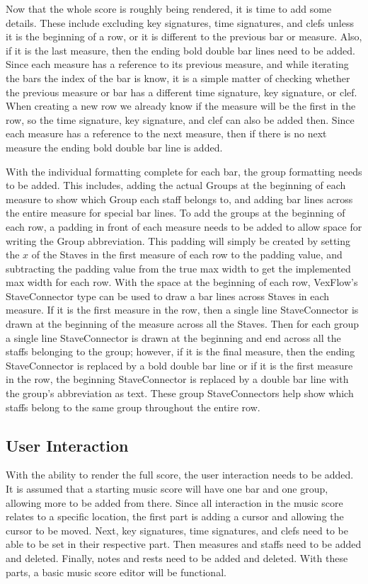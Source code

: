 \documentclass[letterpaper,12pt]{article}
\begin{document}
Now that the whole score is roughly being rendered, it is time to add some details. These include excluding key
signatures, time signatures, and clefs unless it is the beginning of a row, or it is different to the previous bar or
measure. Also, if it is the last measure, then the ending bold double bar lines need to be added. Since each measure has a
reference to its previous measure, and while iterating the bars the index of the bar is know, it is a simple
matter of checking whether the previous measure or bar has a different time signature, key signature, or clef. When
creating a new row we already know if the measure will be the first in the row, so the time signature, key signature,
and clef can also be added then. Since each measure has a reference to the next measure, then if there is no next
measure the ending bold double bar line is added.

With the individual formatting complete for each bar, the group formatting needs to be added. This includes, adding
the actual Groups at the beginning of each measure to show which Group each staff belongs to, and adding bar lines
across the entire measure for special bar lines. To add the groups at the beginning of each row, a padding in front of
each measure needs to be added to allow space for writing the Group abbreviation. This padding will simply be created by
setting the $ x $ of the Staves in the first measure of each row to the padding value, and subtracting the padding
value from the true max width to get the implemented max width for each row. With the space at the beginning of each
row, VexFlow's StaveConnector type can be used to draw a bar lines across Staves in each measure. If it is the first
measure in the row, then a single line StaveConnector is drawn at the beginning of the measure across all the Staves.
Then for each group a single line StaveConnector is drawn at the beginning and end across all the staffs belonging to
the group; however, if it is the final measure, then the ending StaveConnector is replaced by a bold double bar line or
if it is the first measure in the row, the beginning StaveConnector is replaced by a double bar line with the group's
abbreviation as text. These group StaveConnectors help show which staffs belong to the same group throughout the entire
row.

\subsection{User Interaction}

With the ability to render the full score, the user interaction needs to be added. It is assumed that a starting music
score will have one bar and one group, allowing more to be added from there. Since all interaction in the music score
relates to a specific location, the first part is adding a cursor and allowing the cursor to be moved. Next, key
signatures, time signatures, and clefs need to be able to be set in their respective part. Then measures and staffs need
to be added and deleted. Finally, notes and rests need to be added and deleted. With these parts, a basic music score
editor will be functional.
\end{document}
